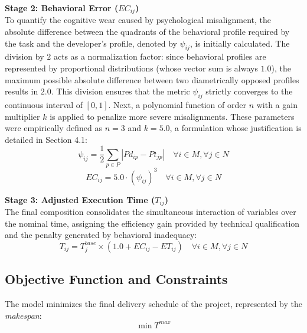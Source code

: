 \documentclass[a4paper,11pt]{article}
\begin{document}
\vspace{0.2cm}
\noindent\textbf{Stage 2: Behavioral Error ($EC_{ij}$)} \\
To quantify the cognitive wear caused by psychological misalignment, the absolute 
difference between the quadrants of the behavioral profile required by the task 
and the developer's profile, denoted by $\psi_{ij}$, is initially calculated. 
The division by $2$ acts as a normalization factor: since behavioral profiles 
are represented by proportional distributions (whose vector sum is always $1.0$), 
the maximum possible absolute difference between two diametrically opposed 
profiles results in $2.0$. This division ensures that the metric $\psi_{ij}$ 
strictly converges to the continuous interval of $[0, 1]$. Next, a polynomial 
function of order $n$ with a gain multiplier $k$ is applied to penalize more 
severe misalignments. These parameters were empirically defined as $n=3$ and 
$k=5.0$, a formulation whose justification is detailed in Section 4.1:
\begin{equation}
    \psi_{ij} = \frac{1}{2} \sum_{p \in P} |Pd_{ip} - Pt_{jp}| \quad \forall i \in M, \forall j \in N
\end{equation}
\begin{equation}
    EC_{ij} = 5.0 \cdot (\psi_{ij})^3 \quad \forall i \in M, \forall j \in N
\end{equation}

\vspace{0.2cm}
\noindent\textbf{Stage 3: Adjusted Execution Time ($T_{ij}$)} \\
The final composition consolidates the simultaneous interaction of variables 
over the nominal time, assigning the efficiency gain provided by technical 
qualification and the penalty generated by behavioral inadequacy:
\begin{equation}
    T_{ij} = T^{base}_j \times (1.0 + EC_{ij} - ET_{ij}) \quad \forall i \in M, \forall j \in N
\end{equation}

\subsection{Objective Function and Constraints}

The model minimizes the final delivery schedule of the project, represented by 
the \textit{makespan}:
\begin{equation}
    \min T^{max}
\end{equation}
\end{document}
